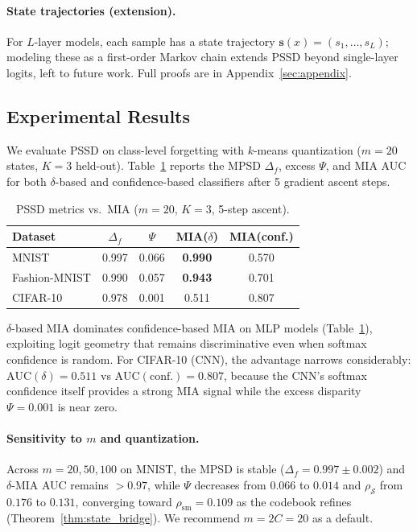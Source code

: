 \documentclass[smallextended]{svjour3}       %
\begin{document}
\paragraph{State trajectories (extension).}
For $L$-layer models, each sample has a state trajectory $\mathbf{s}(x)=(s_1,\dots,s_L)$; modeling these as a first-order Markov chain extends PSSD beyond single-layer logits, left to future work. Full proofs are in Appendix~\ref{sec:appendix}.

\subsection{Experimental Results}

We evaluate PSSD on class-level forgetting with $k$-means quantization ($m{=}20$ states, $K{=}3$ held-out). Table~\ref{tab:pssd_results} reports the MPSD $\Delta_f$, excess $\Psi$, and MIA AUC for both $\delta$-based and confidence-based classifiers after 5 gradient ascent steps.

\begin{table}[t]
\centering
\small
\caption{PSSD metrics vs.\ MIA ($m{=}20$, $K{=}3$, 5-step ascent).}\label{tab:pssd_results}
\setlength{\tabcolsep}{2pt}
\begin{tabular}{l c c c c}
\toprule
Dataset & $\Delta_f$ & $\Psi$ & MIA($\delta$) & MIA(conf.) \\
\midrule
MNIST & 0.997 & 0.066 & \textbf{0.990} & 0.570 \\
Fashion-MNIST & 0.990 & 0.057 & \textbf{0.943} & 0.701 \\
CIFAR-10 & 0.978 & 0.001 & 0.511 & 0.807 \\
\bottomrule
\end{tabular}
\end{table}

$\delta$-based MIA dominates confidence-based MIA on MLP models (Table~\ref{tab:pssd_results}), exploiting logit geometry that remains discriminative even when softmax confidence is random. For CIFAR-10 (CNN), the advantage narrows considerably: $\mathrm{AUC}(\delta){=}0.511$ vs $\mathrm{AUC}(\mathrm{conf.}){=}0.807$, because the CNN's softmax confidence itself provides a strong MIA signal while the excess disparity $\Psi{=}0.001$ is near zero.

\paragraph{Sensitivity to $m$ and quantization.} Across $m{=}20,50,100$ on MNIST, the MPSD is stable ($\Delta_f{=}0.997{\pm}0.002$) and $\delta$-MIA AUC remains $>0.97$, while $\Psi$ decreases from $0.066$ to $0.014$ and $\rho_{\mathcal{S}}$ from $0.176$ to $0.131$, converging toward $\rho_{\mathrm{sm}}{=}0.109$ as the codebook refines (Theorem~\ref{thm:state_bridge}). We recommend $m{=}2C{=}20$ as a default.
\end{document}
